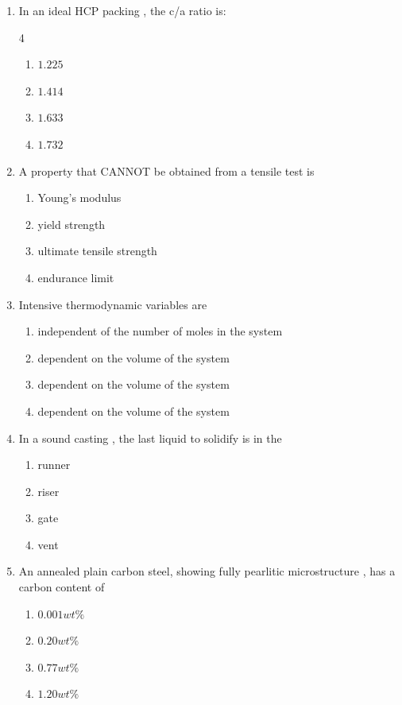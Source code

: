 \documentclass[journal]{IEEEtran}
\theoremstyle{remark}
\begin{document}
\begin{enumerate}
\item  In an ideal HCP packing , the c/a ratio is:\hfill{}

\begin {multicols}{4}
\begin{enumerate}
\item $1.225$
\item $1.414$
\item $1.633$
\item $1.732$
\end{enumerate}
\end{multicols}

\item  A property that CANNOT be obtained from a tensile test is
\hfill{}
\begin{multicols}{2}
\begin{enumerate}
\item Young's modulus
\item yield strength
\item ultimate tensile strength
\item endurance limit
\end{enumerate}
\end{multicols}

\item  Intensive thermodynamic variables are \hfill{}
\begin{enumerate}
\item independent of the number of moles in the system
\item dependent on the volume of the system
\item dependent on the volume of the system
\item dependent on the volume of the system
\end{enumerate}

\item In a sound casting , the last liquid to solidify is in the \hfill{}
\begin{multicols}{4}
\begin{enumerate}
\item runner
\item riser
\item gate
\item vent
\end{enumerate}
\end{multicols}

\item An annealed plain carbon steel, showing fully pearlitic microstructure , has a carbon content of\hfill{}
\begin{multicols}{4}
\begin{enumerate}
\item $0.001wt\%$
\item $0.20wt\%$
\item $0.77wt\%$
\item $1.20wt\%$
\end{enumerate}
\end{multicols}


\end{enumerate}
\end{document}
